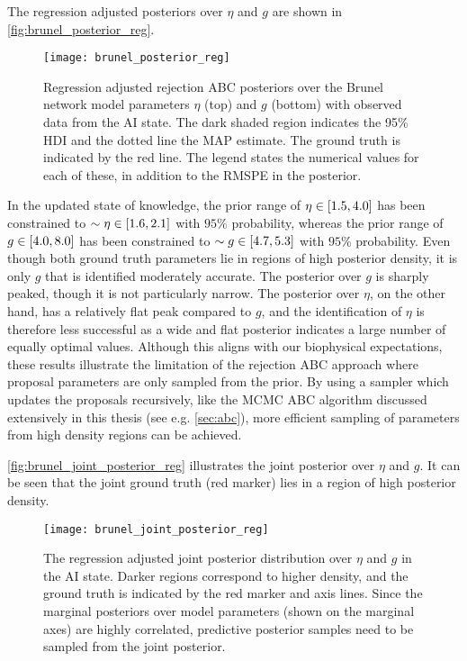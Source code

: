 The regression adjusted posteriors over $\eta$ and $g$ are shown in \autoref{fig:brunel_posterior_reg}. 
\begin{figure}[!htb]
    \centering
    \texttt{[image: brunel\_posterior\_reg]}
    \caption{Regression adjusted rejection ABC posteriors over the Brunel network model parameters $\eta$ (top) and $g$ (bottom) with observed data from the AI state. The dark shaded region indicates the 95\% HDI and the dotted line the MAP estimate. The ground truth is indicated by the red line. The legend states the numerical values for each of these, in addition to the RMSPE in the posterior.
    }
    \label{fig:brunel_posterior_reg}
\end{figure}
In the updated state of knowledge, the prior range of $\eta \in \qty[1.5, 4.0]$ has been constrained to $\sim \eta \in \qty[1.6, 2.1]$ with $95\%$ probability, whereas the prior range of $g \in \qty[4.0, 8.0]$ has been constrained to $\sim g \in \qty[4.7, 5.3]$ with $95\%$ probability. Even though both ground truth parameters lie in regions of high posterior density, it is only $g$ that is identified moderately accurate. The posterior over $g$ is sharply peaked, though it is not particularly narrow. The posterior over $\eta$, on the other hand, has a relatively flat peak compared to $g$, and the identification of $\eta$ is therefore less successful as a wide and flat posterior indicates a large number of equally optimal values. Although this aligns with our biophysical expectations, these results illustrate the limitation of the rejection ABC approach where proposal parameters are only sampled from the prior. By using a sampler which updates the proposals recursively, like the MCMC ABC algorithm discussed extensively in this thesis (see e.g. \cref{sec:abc}), more efficient sampling of parameters from high density regions can be achieved. 

\autoref{fig:brunel_joint_posterior_reg} illustrates the joint posterior over $\eta$ and $g$. It can be seen that the joint ground truth (red marker) lies in a region of high posterior density. 
\begin{figure}[H]
    \centering
    \texttt{[image: brunel\_joint\_posterior\_reg]}
    \caption{The regression adjusted joint posterior distribution over $\eta$ and $g$ in the AI state. Darker regions correspond to higher density, and the ground truth is indicated by the red marker and axis lines. Since the marginal posteriors over model parameters (shown on the marginal axes) are highly correlated, predictive posterior samples need to be sampled from the joint posterior. 
    }
    \label{fig:brunel_joint_posterior_reg}
\end{figure}


